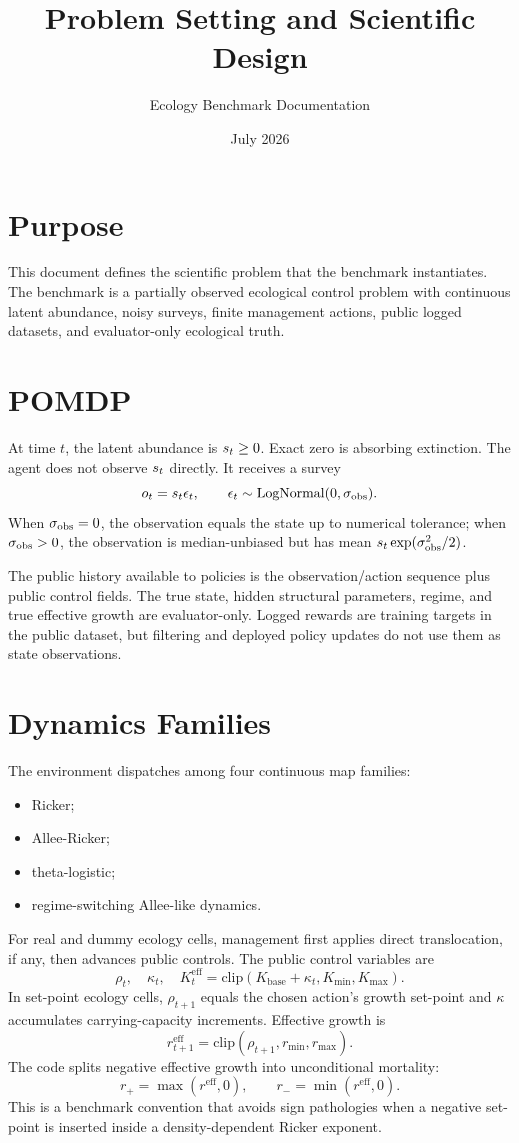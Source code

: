 \documentclass[11pt]{article}
\title{Problem Setting and Scientific Design}
\author{Ecology Benchmark Documentation}
\date{July 2026}
\begin{document}
\maketitle

\section{Purpose}

This document defines the scientific problem that the benchmark instantiates.
The benchmark is a partially observed ecological control problem with continuous
latent abundance, noisy surveys, finite management actions, public logged
datasets, and evaluator-only ecological truth.

\section{POMDP}

At time $t$, the latent abundance is $s_t \ge 0$. Exact zero is absorbing
extinction. The agent does not observe $s_t$ directly. It receives a survey
\[
  o_t = s_t \epsilon_t,\qquad
  \epsilon_t \sim \mathrm{LogNormal}(0,\sigma_{\mathrm{obs}}).
\]
When $\sigma_{\mathrm{obs}}=0$, the observation equals the state up to numerical tolerance; when
$\sigma_{\mathrm{obs}}>0$, the observation is median-unbiased but has mean
$s_t\exp(\sigma_{\mathrm{obs}}^2/2)$.

The public history available to policies is the observation/action sequence plus
public control fields. The true state, hidden structural parameters, regime, and
true effective growth are evaluator-only. Logged rewards are training targets in
the public dataset, but filtering and deployed policy updates do not use them as
state observations.

\section{Dynamics Families}

The environment dispatches among four continuous map families:
\begin{itemize}
  \item Ricker;
  \item Allee-Ricker;
  \item theta-logistic;
  \item regime-switching Allee-like dynamics.
\end{itemize}

For real and dummy ecology cells, management first applies direct
translocation, if any, then advances public controls. The public control
variables are
\[
  \rho_t,\quad \kappa_t,\quad
  K^{\mathrm{eff}}_t =
    \mathrm{clip}(K_{\mathrm{base}}+\kappa_t,K_{\min},K_{\max}).
\]
In set-point ecology cells, $\rho_{t+1}$ equals the chosen action's growth
set-point and $\kappa$ accumulates carrying-capacity increments. Effective growth
is
\[
  r^{\mathrm{eff}}_{t+1}
  =
  \mathrm{clip}(\rho_{t+1}, r_{\min}, r_{\max}).
\]
The code splits negative effective growth into unconditional mortality:
\[
  r_+ = \max(r^{\mathrm{eff}},0),\qquad
  r_- = \min(r^{\mathrm{eff}},0).
\]
This is a benchmark convention that avoids sign pathologies when a negative
set-point is inserted inside a density-dependent Ricker exponent.
\end{document}
